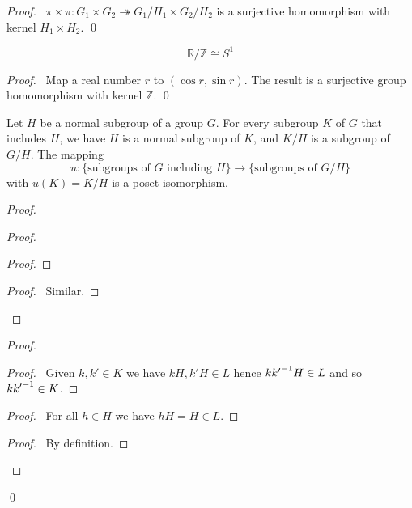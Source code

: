 \begin{proof}
\pf\ $\pi \times \pi : G_1 \times G_2 \twoheadrightarrow G_1 / H_1 \times G_2 / H_2$ is a surjective homomorphism with kernel $H_1 \times H_2$. \qed
\end{proof}

\begin{ex}
\[ \mathbb{R} / \mathbb{Z} \cong S^1 \]
\end{ex}

\begin{proof}
\pf\ Map a real number $r$ to $(\cos r, \sin r)$. The result is a surjective group homomorphism with kernel $\mathbb{Z}$. \qed
\end{proof}

\begin{prop}
Let $H$ be a normal subgroup of a group $G$. For every subgroup $K$ of $G$ that includes $H$, we have $H$ is a normal subgroup of $K$, and $K/H$ is a subgroup of $G/H$. The mapping
\[ u : \{ \text{subgroups of } G \text{ including } H \} \rightarrow \{ \text{subgroups of } G / H \} \]
with $u(K) = K/H$ is a poset isomorphism.
\end{prop}

\begin{proof}
\pf
{}
\begin{proof}
	\begin{proof}
	\end{proof}
	\begin{proof}
		\pf\ Similar.
	\end{proof}
\end{proof}
\begin{proof}
	\begin{proof}
		\pf\ Given $k,k' \in K$ we have $kH,k'H \in L$ hence $k{k'}^{-1}H \in L$ and so $k{k'}^{-1} \in K$.
	\end{proof}
	\begin{proof}
		\pf\ For all $h \in H$ we have $hH = H \in L$.
	\end{proof}
	\begin{proof}
		\pf\ By definition.
	\end{proof}
\end{proof}
\qed
\end{proof}

